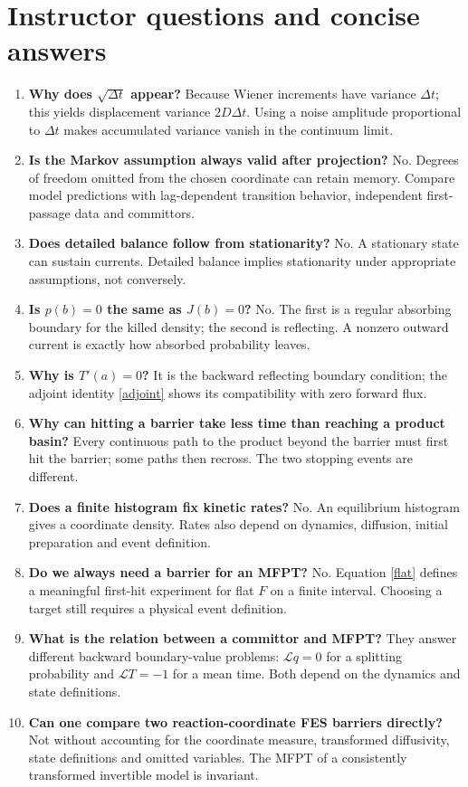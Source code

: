\documentclass[11pt,a4paper]{article}
\newcommand{\Lop}{\mathcal L}
\theoremstyle{remark}\newtheorem*{remark}{Physical interpretation}
\begin{document}
\section{Instructor questions and concise answers}
\begin{enumerate}
\item \textbf{Why does $\sqrt{\Delta t}$ appear?} Because Wiener increments have variance $\Delta t$; this yields displacement variance $2D\Delta t$. Using a noise amplitude proportional to $\Delta t$ makes accumulated variance vanish in the continuum limit.
\item \textbf{Is the Markov assumption always valid after projection?} No. Degrees of freedom omitted from the chosen coordinate can retain memory. Compare model predictions with lag-dependent transition behavior, independent first-passage data and committors.
\item \textbf{Does detailed balance follow from stationarity?} No. A stationary state can sustain currents. Detailed balance implies stationarity under appropriate assumptions, not conversely.
\item \textbf{Is $p(b)=0$ the same as $J(b)=0$?} No. The first is a regular absorbing boundary for the killed density; the second is reflecting. A nonzero outward current is exactly how absorbed probability leaves.
\item \textbf{Why is $T'(a)=0$?} It is the backward reflecting boundary condition; the adjoint identity \eqref{adjoint} shows its compatibility with zero forward flux.
\item \textbf{Why can hitting a barrier take less time than reaching a product basin?} Every continuous path to the product beyond the barrier must first hit the barrier; some paths then recross. The two stopping events are different.
\item \textbf{Does a finite histogram fix kinetic rates?} No. An equilibrium histogram gives a coordinate density. Rates also depend on dynamics, diffusion, initial preparation and event definition.
\item \textbf{Do we always need a barrier for an MFPT?} No. Equation \eqref{flat} defines a meaningful first-hit experiment for flat $F$ on a finite interval. Choosing a target still requires a physical event definition.
\item \textbf{What is the relation between a committor and MFPT?} They answer different backward boundary-value problems: $\Lop q=0$ for a splitting probability and $\Lop T=-1$ for a mean time. Both depend on the dynamics and state definitions.
\item \textbf{Can one compare two reaction-coordinate FES barriers directly?} Not without accounting for the coordinate measure, transformed diffusivity, state definitions and omitted variables. The MFPT of a consistently transformed invertible model is invariant.
\end{enumerate}
\end{document}
